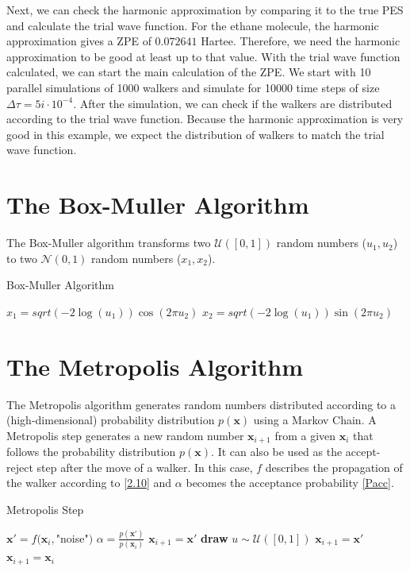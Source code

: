 \documentclass [12pt]{report}
\begin{document}
Next, we can check the harmonic approximation by comparing it to the true PES and calculate the trial wave function. For the ethane molecule, the harmonic approximation gives a ZPE of $0.072641$ Hartee. Therefore, we need the harmonic approximation to be good at least up to that value. With the trial wave function calculated, we can start the main calculation of the ZPE. We start with 10 parallel simulations of 1000 walkers and simulate for 10000 time steps of size $\Delta \tau = 5i \cdot 10^{-4}$. After the simulation, we can check if the walkers are distributed according to the trial wave function. Because the harmonic approximation is very good in this example, we expect the distribution of walkers to match the trial wave function.

\begin{appendices}
\chapter{The Box-Muller Algorithm} \label{appendixA}
The Box-Muller algorithm transforms two $\mathcal{U}([0,1])$ random numbers ($u_1, u_2$) to two $\mathcal{N}(0,1)$ random numbers ($x_1, x_2$).

\begin{algorithm}
\caption{Box-Muller Algorithm}\label{box-muller}
\begin{algorithmic}[1]
\State $x_1 = sqrt(-2\log(u_1))\cos(2\pi u_2)$
\State $x_2 = sqrt(-2\log(u_1))\sin(2\pi u_2)$
\EndProcedure
\end{algorithmic}
\end{algorithm}

\chapter{The Metropolis Algorithm} \label{appendixB}
The Metropolis algorithm generates random numbers distributed according to a (high-dimensional) probability distribution $p(\bm{x})$ using a Markov Chain. A Metropolis step generates a new random number $\bm{x}_{i+1}$ from a given $\bm{x}_i$ that follows the probability distribution $p(\bm{x})$. It can also be used as the accept-reject step after the move of a walker. In this case, $f$ describes the propagation of the walker according to \eqref{2.10} and $\alpha$ becomes the acceptance probability \eqref{Pacc}.

\begin{algorithm}
\caption{Metropolis Step}\label{metropolis}
\begin{algorithmic}[1]
\State $\bm{x}' = f(\bm{x}_i,$"noise"$)$ 
\State $\alpha = \frac{p(\bm{x}')}{p(\bm{x}_i)}$
	\State $\bm{x}_{i+1} = \bm{x}'$ 
\Else
	\State \textbf{draw} $u \sim \mathcal{U}([0,1])$
		\State $\bm{x}_{i+1} = \bm{x}'$ 
	\Else
		\State $\bm{x}_{i+1} = \bm{x}_i$ 
	\EndIf
\EndIf 
\EndProcedure
\end{algorithmic}
\end{algorithm}


\end{appendices}
\end{document}
